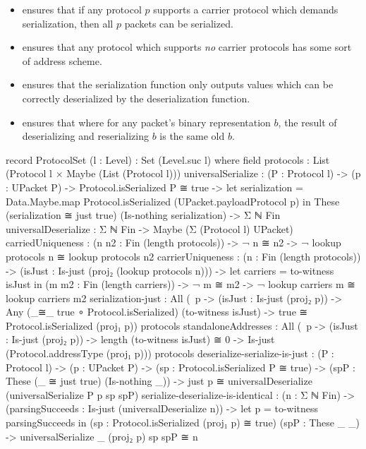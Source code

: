 \documentclass{report}
\begin{document}
\begin{itemize}
  \item {}  ensures that if any protocol \(p\) supports a carrier protocol which demands serialization, then all \(p\) packets can be serialized.
  \item {}  ensures that any protocol which supports \emph{no} carrier protocols has some sort of address scheme.
  \item {}  ensures that the serialization function only outputs values which can be correctly deserialized by the deserialization function.
  \item {}  ensures that where for any packet's binary representation \(b\), the result of deserializing and reserializing \(b\) is the same old \(b\).
\end{itemize}

\begin{code}
  record ProtocolSet (l : Level) : Set (Level.suc l) where
    field
      protocols : List (Protocol l × Maybe (List (Protocol l)))
      universalSerialize :
        (P : Protocol l) ->
        (p : UPacket P) ->
        Protocol.isSerialized P ≅ true ->
        let serialization = Data.Maybe.map Protocol.isSerialized
                                           (UPacket.payloadProtocol p) in
        These (serialization ≅ just true) (Is-nothing serialization) ->
        Σ ℕ Fin
      universalDeserialize : Σ ℕ Fin -> Maybe (Σ (Protocol l) UPacket)
      carriedUniqueness :
        (n n2 : Fin (length protocols)) ->
        ¬ n ≅ n2 ->
        ¬ lookup protocols n ≅ lookup protocols n2
      carrierUniqueness :
        (n : Fin (length protocols)) ->
        (isJust : Is-just (proj₂ (lookup protocols n))) ->
        let carriers = to-witness isJust in
        (m m2 : Fin (length carriers)) ->
        ¬ m ≅ m2 ->
        ¬ lookup carriers m ≅ lookup carriers m2
      serialization-just :
        All (\ p -> (isJust : Is-just (proj₂ p))
                 -> Any (_≅_ true ∘ Protocol.isSerialized)
                        (to-witness isJust)
                 -> true ≅ Protocol.isSerialized (proj₁ p))
            protocols
      standaloneAddresses :
        All (\ p -> (isJust : Is-just (proj₂ p))
                 -> length (to-witness isJust) ≅ 0
                 -> Is-just (Protocol.addressType (proj₁ p)))
            protocols
      deserialize-serialize-is-just :
        (P : Protocol l) ->
        (p : UPacket P) ->
        (sp : Protocol.isSerialized P ≅ true) ->
        (spP : These (_ ≅ just true) (Is-nothing _)) ->
        just p ≅
        universalDeserialize (universalSerialize P p sp spP)
      serialize-deserialize-is-identical :
        (n : Σ ℕ Fin) ->
        (parsingSucceeds : Is-just (universalDeserialize n)) ->
        let p = to-witness parsingSucceeds in
        (sp : Protocol.isSerialized (proj₁ p) ≅ true)
        (spP : These _ _) ->
        universalSerialize _ (proj₂ p) sp spP ≅ n
\end{code}
\end{document}
